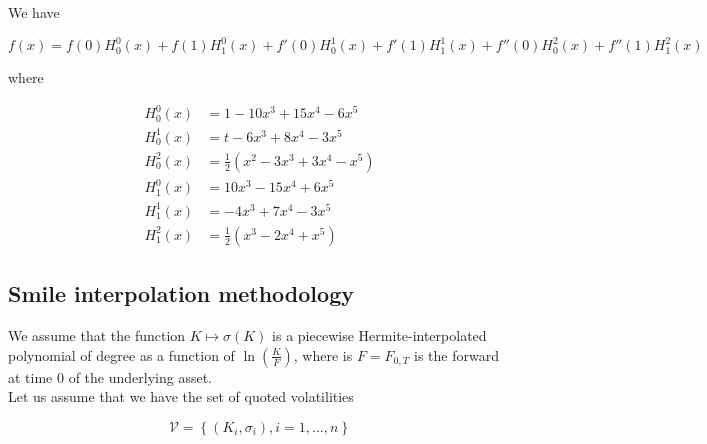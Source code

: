 \documentclass{article}
\begin{document}
\noindent We have 

\begin{equation}
	f(x) = f(0) H_0^0(x) + f(1) H_1^0(x) + f'(0) H_0^1(x) + f'(1) H_1^1(x) + f''(0) H_0^2(x) + f''(1) H_1^2(x)
\end{equation}

\noindent where

\begin{equation}
\begin{aligned}
	H_0^0(x) &= 1 - 10 x^3 + 15 x^4 - 6 x^5\\
	H_0^1(x) &= t - 6 x^3 + 8 x^4 - 3 x^5\\
	H_0^2(x) &= \frac{1}{2} \left(x^2 - 3 x^3 + 3 x^4 - x^5\right)\\
	H_1^0(x) &= 10x^3 - 15 x^4 + 6 x^5\\
	H_1^1(x) &= -4x^3 + 7 x^4 - 3x^5\\
	H_1^2(x) &= \frac{1}{2} \left(x^3 - 2x^4 + x^5\right)
\end{aligned}
\end{equation}

\subsection{Smile interpolation methodology}

We assume that the function $K \mapsto \sigma(K)$ is a piecewise Hermite-interpolated polynomial of degree as a function of $\ln\left(\frac{K}{F}\right)$, where is $F=F_{0,T}$ is the forward at time $0$ of the underlying asset.\\

\noindent Let us assume that we have the set of quoted volatilities

\begin{equation*}
	\mathcal{V} = \left\{(K_i, \sigma_i), i = 1,\dots, n\right\}
\end{equation*}
\end{document}

